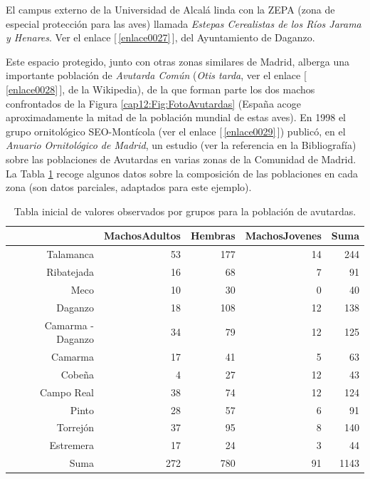 \begin{Ejemplo}\label{cap12:ejem:Avutardas}
El campus externo de la Universidad de Alcalá linda con la ZEPA (zona de especial protección para
las aves) llamada {\em Estepas Cerealistas de los Ríos Jarama y Henares}. Ver el enlace [\,\ref{enlace0027}\,]\label{enlace0027a}, del
Ayuntamiento de Daganzo.



Este espacio protegido, junto con otras zonas similares de Madrid, alberga una importante población
de {\em Avutarda Común} ({\em Otis
tarda}, ver el enlace [\,\ref{enlace0028}\,]\label{enlace0028a}, de la Wikipedia), de la que forman parte los dos machos confrontados de la Figura
\ref{cap12:Fig:FotoAvutardas} (España acoge aproximadamente la mitad de la población mundial de
estas aves). En 1998 el grupo ornitológico SEO-Montícola
(ver el enlace [\,\ref{enlace0029}\,]\label{enlace0029a}) publicó, en el {\em Anuario Ornitológico
de Madrid}, un estudio (ver la referencia \cite{AvutardasMadrid} en la Bibliografía) sobre las
poblaciones de Avutardas  en varias zonas de la Comunidad de Madrid. La Tabla
\ref{cap13:Tabla:AvutardasValoresObservados} recoge algunos datos sobre la composición de las
poblaciones en cada zona (son datos parciales, adaptados para este ejemplo).
    \begin{table}[ht]
    \centering
    \begin{tabular}{rrrrr}
      \hline
     & MachosAdultos & Hembras & MachosJovenes & Suma \\
      \hline
      Talamanca & 53 & 177 & 14 & 244 \\
      Ribatejada & 16 & 68 & 7 & 91 \\
      Meco & 10 & 30 & 0 & 40 \\
      Daganzo & 18 & 108 & 12 & 138 \\
      Camarma - Daganzo & 34 & 79 & 12 & 125 \\
      Camarma & 17 & 41 & 5 & 63 \\
      Cobeña & 4 & 27 & 12 & 43 \\
      Campo Real & 38 & 74 & 12 & 124 \\
      Pinto & 28 & 57 & 6 & 91 \\
      Torrejón & 37 & 95 & 8 & 140 \\
      Estremera & 17 & 24 & 3 & 44 \\
      \hline
      Suma & 272 & 780 & 91 & 1143 \\
       \hline
    \end{tabular}
    \caption{Tabla inicial de valores observados por grupos para la población de avutardas.}\label{cap13:Tabla:AvutardasValoresObservados}
    \end{table}


\end{Ejemplo}
